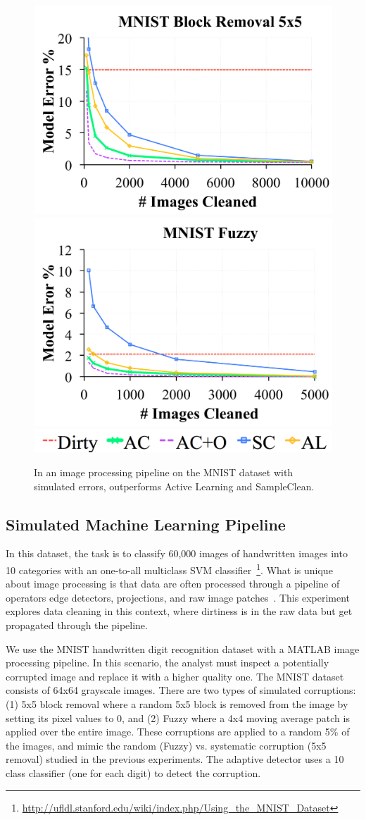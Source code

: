 \begin{figure}[t]
\centering
 \includegraphics[width=0.49\columnwidth]{exp/exp7a.pdf}
 \includegraphics[width=0.49\columnwidth]{exp/exp7b.pdf}
 \includegraphics[width=0.49\columnwidth]{exp/legend-general.png}\vspace{-0.5em}
 \caption{In an image processing pipeline on the MNIST dataset with simulated errors, \sys outperforms Active Learning and SampleClean.  \label{mnist}}\vspace{-1em}
\end{figure}

\subsection{Simulated Machine Learning Pipeline}
In this dataset, the task is to classify 60,000 images of handwritten images into 10 categories with an one-to-all multiclass SVM classifier~\footnote{\scriptsize\url{http://ufldl.stanford.edu/wiki/index.php/Using_the_MNIST_Dataset}}. 
What is unique about image processing is that data are often processed through a pipeline of operators edge detectors, projections, and raw image patches~\cite{keystone,tensor}.
This experiment explores data cleaning in this context, where dirtiness is in the raw data but get propagated through the pipeline.

We use the MNIST handwritten digit recognition dataset with a MATLAB image processing pipeline.
In this scenario, the analyst must inspect a potentially corrupted image and replace it with a higher quality one.
The MNIST dataset consists of 64x64 grayscale images.
There are two types of simulated corruptions: (1) 5x5 block removal where a random 5x5 block is removed from the image by setting its pixel values to 0, and (2) Fuzzy where a 4x4 moving average patch is applied over the entire image.
These corruptions are applied to a random 5\% of the images, and mimic the random (Fuzzy) vs. systematic corruption (5x5 removal) studied in the previous experiments.
The adaptive detector uses a 10 class classifier (one for each digit) to detect the corruption.

